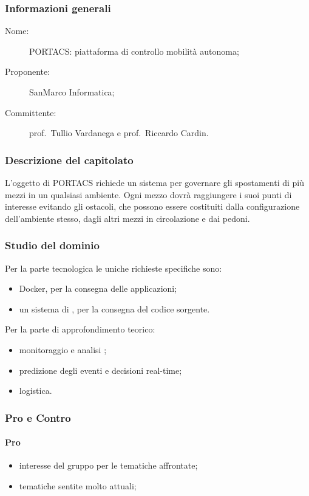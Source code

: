 \subsubsection{Informazioni generali}
\begin{description}
	\item[Nome:] PORTACS: piattaforma di controllo mobilità autonoma;
	\item[Proponente:] SanMarco Informatica;
	\item[Committente:] prof.~Tullio Vardanega e prof.~Riccardo Cardin.
\end{description}
\subsubsection{Descrizione del capitolato}
L'oggetto di PORTACS richiede un sistema per governare gli spostamenti di più mezzi in un qualsiasi ambiente. Ogni mezzo dovrà raggiungere i suoi punti di interesse evitando gli ostacoli, che possono essere costituiti dalla configurazione dell'ambiente stesso, dagli altri mezzi in circolazione e dai pedoni.
\subsubsection{Studio del dominio}
Per la parte tecnologica le uniche richieste specifiche sono:
\begin{itemize}
	\item Docker, per la consegna delle applicazioni;
	\item un sistema di , per la consegna del codice sorgente.
\end{itemize}

Per la parte di approfondimento teorico:
\begin{itemize}
	\item monitoraggio e analisi ;
	\item predizione degli eventi e decisioni real-time;
	\item logistica.
\end{itemize}
\subsubsection{Pro e Contro}
\paragraph*{Pro}
\begin{itemize}
	\item interesse del gruppo per le tematiche affrontate;
	\item tematiche sentite molto attuali;
\end{itemize}
